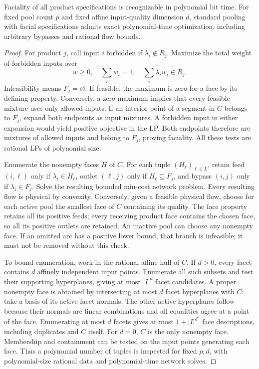 \begin{proposition}\label{s1:face-alg}
Faciality of all product specifications is recognizable in polynomial
bit time. For fixed pool count $p$ and fixed affine input-quality
dimension $d$, standard pooling with facial specifications admits exact
polynomial-time optimization, including arbitrary bypasses and rational
flow bounds.
\end{proposition}
\begin{proof}
For product $j$, call input $i$ forbidden if $\lambda_i\notin R_j$.
Maximize the total weight of forbidden inputs over
\[
 w\ge0,\quad\sum_iw_i=1,\quad\sum_i\lambda_iw_i\in R_j.
\]
Infeasibility means $F_j=\varnothing$. If feasible, the maximum is zero
for a face by its defining property. Conversely, a zero maximum implies
that every feasible mixture uses only allowed inputs. If an interior
point of a segment in $C$ belongs to $F_j$, expand both endpoints as
input mixtures. A forbidden input in either expansion would yield
positive objective in the LP. Both endpoints therefore are mixtures of
allowed inputs and belong to $F_j$, proving faciality. All these tests
are rational LPs of polynomial size.

Enumerate the nonempty faces $H$ of $C$. For each tuple $(H_\ell)_{\ell\in L}$,
retain feed $(i,\ell)$ only if $\lambda_i\in H_\ell$, outlet $(\ell,j)$
only if $H_\ell\subseteq F_j$, and bypass $(i,j)$ only if
$\lambda_i\in F_j$. Solve the resulting bounded min-cost network
problem. Every resulting flow is physical by convexity. Conversely,
given a feasible physical flow, choose for each active pool the smallest
face of $C$ containing its quality. The face property retains all its
positive feeds; every receiving product face contains the chosen face,
so all its positive outlets are retained. An inactive pool can choose
any nonempty face. If an omitted arc has a positive lower bound, that
branch is infeasible; it must not be removed without this check.

To bound enumeration, work in the rational affine hull of $C$. If
$d>0$, every facet contains $d$ affinely independent input points.
Enumerate all such subsets and test their supporting hyperplanes, giving
at most $|I|^d$ facet candidates. A proper nonempty face is obtained by
intersecting at most $d$ facet hyperplanes with $C$: take a basis of
its active facet normals. The other active hyperplanes follow because
their normals are linear combinations and all equalities agree at a
point of the face. Enumerating at most $d$ facets gives at most
$1+|I|^{d^2}$ face descriptions, including duplicates and $C$ itself.
For $d=0$, $C$ is the only nonempty face. Membership and containment can
be tested on the input points generating each face. Thus a polynomial
number of tuples is inspected for fixed $p,d$, with polynomial-size
rational data and polynomial-time network solves.
\end{proof}

